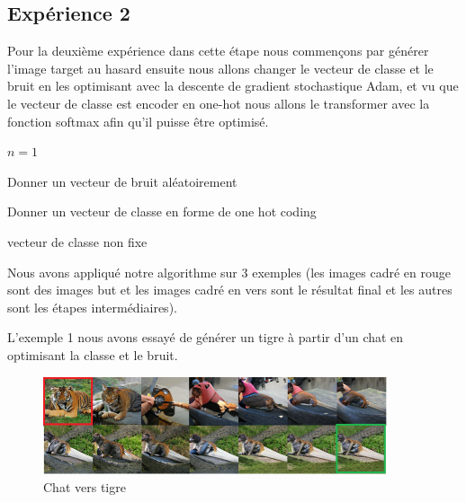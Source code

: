 \subsection{Expérience 2}
Pour la deuxième expérience dans cette étape nous commençons par générer l'image target au hasard ensuite nous allons changer le vecteur de classe et le bruit en les optimisant avec la descente de gradient stochastique Adam, et vu que le vecteur de classe est encoder en one-hot nous allons le transformer avec la fonction softmax afin qu'il puisse être optimisé.

\begin{algorithm}[H]
	
	\SetAlgoLined
	\;
	$ n = 1 $
	
	Donner un vecteur de bruit aléatoirement
	
	Donner un vecteur de classe en forme de one hot coding
	
	\caption{vecteur de classe non fixe}
\end{algorithm}

Nous avons appliqué notre algorithme sur 3 exemples (les images cadré en rouge sont des images but et les images cadré en vers sont le résultat final et les autres sont les étapes intermédiaires).

L'exemple 1 nous avons essayé de générer un tigre à partir d'un chat en optimisant la classe et le bruit.
\begin{figure}[H] 
	\centering 
	\includegraphics[width=0.9\textwidth]{./resources/img/cat2tiger_1.png} %
	\caption{Chat vers tigre} %
\end{figure}

